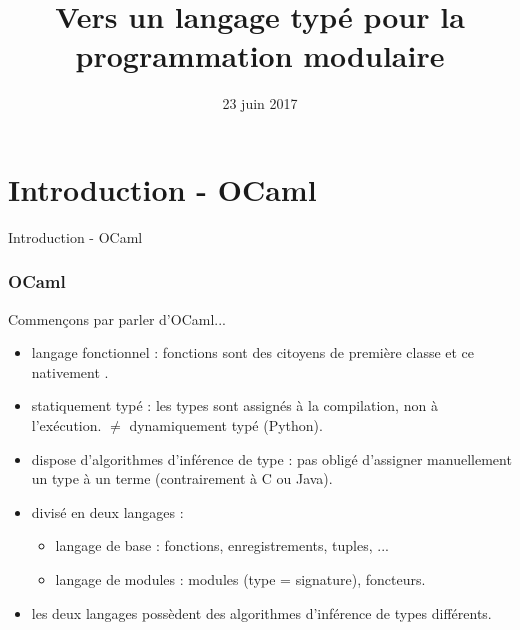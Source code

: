 \documentclass{beamer}
\begin{document}
\title{Vers un langage typé pour la programmation modulaire}
\date{23 juin 2017}

\maketitle

\begin{frame}
	\tableofcontents
\end{frame}

\section{Introduction - OCaml}

\begin{frame}
	\begin{center}
		\Huge{Introduction - OCaml}
	\end{center}
\end{frame}

\begin{frame}
  \frametitle{OCaml}
  Commençons par parler d'OCaml...
	\begin{center}
    \begin{itemize}
    \item langage fonctionnel : fonctions sont des citoyens de première classe
      et ce \og nativement \fg.
    \item statiquement typé : les types sont assignés à la compilation, non à
      l'exécution. $\neq$ dynamiquement typé (Python).
    \item dispose d'algorithmes d'inférence de type : pas obligé d'assigner
      manuellement un type à un terme (contrairement à C ou Java).
    \item divisé en deux \og langages \fg :
      \begin{itemize}
      \item langage de base : fonctions, enregistrements, tuples, ...
      \item langage de modules : modules (type = signature), foncteurs.
      \end{itemize}
    \item les deux langages possèdent des algorithmes d'inférence de types différents.
    \end{itemize}
	\end{center}
\end{frame}

%
\end{document}
